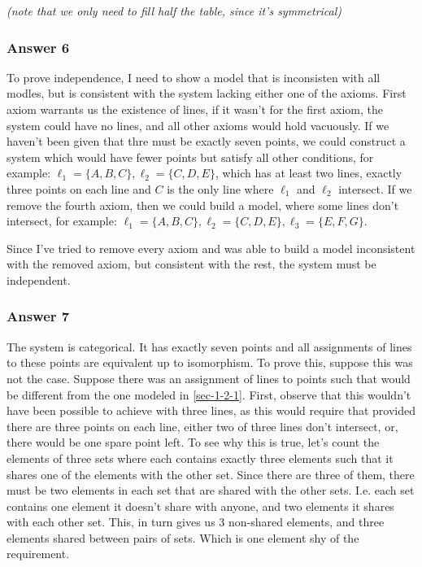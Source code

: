 \documentclass[11pt]{article}
\begin{document}
\emph{(note that we only need to fill half the table, since it's symmetrical)}
\subsubsection{Answer 6}
\label{sec-1-2-2}
To prove independence, I need to show a model that is inconsisten with
all modles, but is consistent with the system lacking either one of the
axioms.  First axiom warrants us the existence of lines, if it wasn't
for the first axiom, the system could have no lines, and all other
axioms would hold vacuously.  If we haven't been given that thre must
be exactly seven points, we could construct a system which would have
fewer points but satisfy all other conditions, for example:
$\ell_1=\{A,B,C\},\ell_2=\{C,D,E\}$, which has at least two lines,
exactly three points on each line and $C$ is the only line where $\ell_1$
and $\ell_2$ intersect.  If we remove the fourth axiom, then we could
build a model, where some lines don't intersect, for example:
$\ell_1=\{A,B,C\},\ell_2=\{C,D,E\},\ell_3=\{E,F,G\}$.

Since I've tried to remove every axiom and was able to build a model
inconsistent with the removed axiom, but consistent with the rest, the
system must be independent.
\subsubsection{Answer 7}
\label{sec-1-2-3}
The system is categorical.  It has exactly seven points and all
assignments of lines to these points are equivalent up to isomorphism.
To prove this, suppose this was not the case.  Suppose there was
an assignment of lines to points such that would be different from
the one modeled in \ref{sec-1-2-1}.  First, observe that this wouldn't have
been possible to achieve with three lines, as this would require that
provided there are three points on each line, either two of three lines
don't intersect, or, there would be one spare point left.  To see
why this is true, let's count the elements of three sets where each
contains exactly three elements such that it shares one of the elements
with the other set.  Since there are three of them, there must be two
elements in each set that are shared with the other sets.  I.e. each
set contains one element it doesn't share with anyone, and two elements
it shares with each other set.  This, in turn gives us 3 non-shared
elements, and three elements shared between pairs of sets.  Which is
one element shy of the requirement.
\end{document}
